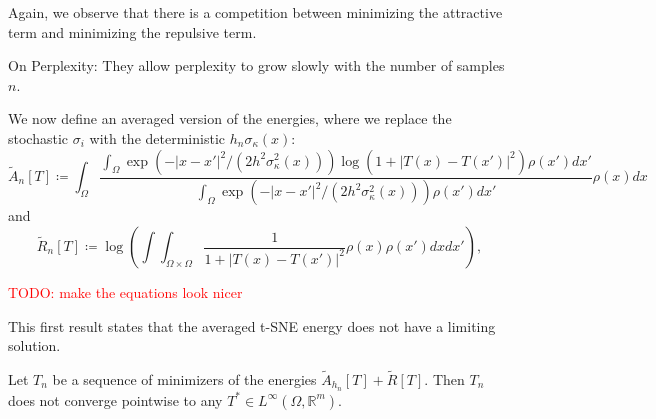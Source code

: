 Again, we observe that there is a competition between minimizing the attractive term and minimizing the repulsive term. 

On Perplexity: They allow perplexity to grow slowly with the number of samples $n$. 

We now define an averaged version of the energies, where we replace the stochastic $\sigma_i$ with the deterministic $h_n \sigma_\kappa(x)$: 
\begin{equation}
    \tilde{A}_n[T] \coloneq  \int_{\Omega} \frac{\int_{\Omega} \exp(-|x - x'|^2/(2 h^2 \sigma_\kappa^2(x))) \log(1+ |T(x) - T(x')|^2) \rho(x')dx'}{\int_{\Omega} \exp(-|x - x'|^2/(2 h^2 \sigma_\kappa^2(x))) \rho(x')dx'} \rho(x)dx  
\end{equation}
and 
\begin{equation}
    \tilde{R}_n[T] \coloneq \log \left( \int \int_{\Omega \times \Omega} \frac{1}{1+ |T(x) - T(x')|^2} \rho(x) \rho(x')dx dx' \right), 
\end{equation}

\textcolor{red}{TODO: make the equations look nicer}

This first result states that the averaged t-SNE energy does not have a limiting solution. 
\begin{thm}
    Let $T_n$ be a sequence of minimizers of the energies $\tilde{A}_{h_n}[T] + \tilde{R}[T]$. Then $T_n$ does not converge pointwise to any $T^* \in L^\infty(\Omega, \mathbb{R}^m)$. 
\end{thm}
